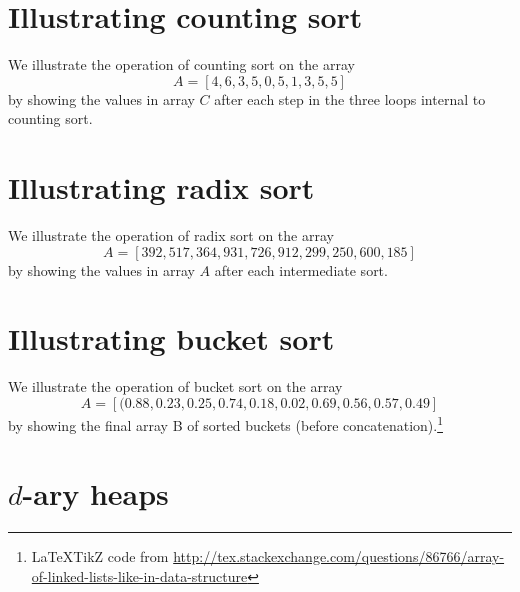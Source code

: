 \documentclass[paper=a4, fontsize=11pt]{scrartcl} %
\numberwithin{equation}{section} %
\numberwithin{figure}{section} %
\numberwithin{table}{section} %
\begin{document}
\section{Illustrating counting sort}

We illustrate the operation of counting sort on the array
\[A = [4, 6, 3, 5, 0, 5, 1, 3, 5, 5]\]
by showing the values in array $C$ after each step in the three loops internal to counting sort.



\section{Illustrating radix sort}

We illustrate the operation of radix sort on the array
\[A = [392, 517, 364, 931, 726, 912, 299, 250, 600, 185]\]
by showing the values in array $A$ after each intermediate sort.


\section{Illustrating bucket sort}

We illustrate the operation of bucket sort on the array
\[A = [(0.88, 0.23, 0.25, 0.74, 0.18, 0.02, 0.69, 0.56, 0.57, 0.49]\]
by showing the final array B of sorted buckets (before concatenation).\footnote{\LaTeX  TikZ code from \tiny\url{http://tex.stackexchange.com/questions/86766/array-of-linked-lists-like-in-data-structure}}\\
\begin{center}

\end{center}
\FloatBarrier
\section{$d$-ary heaps}
\end{document}
